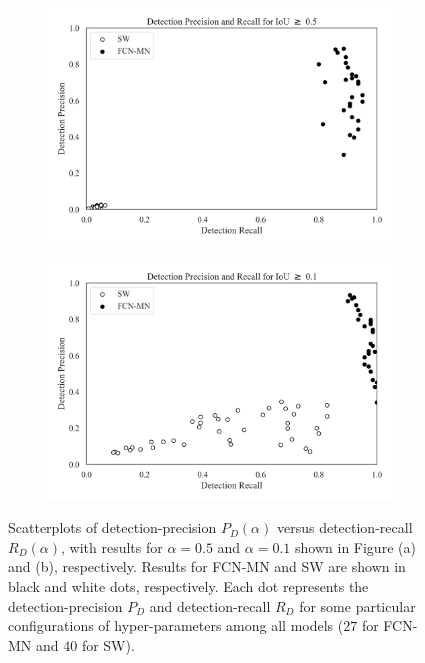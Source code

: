 \documentclass[a4paper,authoryear,review]{elsarticle}
\begin{document}
 \begin{figure}

    \centering
  \begin{subfigure}[b]{0.97\textwidth}
       \centering
       \includegraphics[width=\textwidth]{Figure4-a.png}
       \caption{}
       \label{fig:Figure3-a}
  \end{subfigure}
  \hfill
  \begin{subfigure}[b]{0.97\textwidth}
       \centering
       \includegraphics[width=\textwidth]{Figure4-b.png}
       \caption{}
       \label{fig:Figure3-b}
  \end{subfigure}
    \caption{
Scatterplots of detection-precision $P_D(\alpha)$ versus detection-recall $R_D(\alpha)$, with  results for $\alpha=0.5$ and $\alpha=0.1$ shown in Figure (a) and (b), respectively. Results for FCN-MN and SW are shown in black and white dots, respectively. Each dot represents the detection-precision $P_D$ and detection-recall $R_D$ for some particular configurations of hyper-parameters among all models ($27$ for FCN-MN and $40$ for SW).
    }
    \label{fig:Figure3}
\end{figure}
\end{document}
